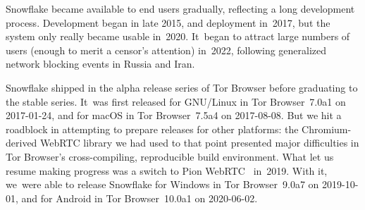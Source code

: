 \documentclass[letterpaper,twocolumn]{article}
\begin{document}
Snowflake became available to end users gradually,
reflecting a long development process.
Development began in late 2015,
and deployment in~2017,
but the system only really became usable in~2020.
It~began to attract large numbers of users
(enough to merit a censor's attention)
in~2022, following generalized
network blocking events in Russia and Iran.

Snowflake shipped in the alpha release series of Tor Browser
before graduating to the stable series.
It~was first released for GNU/Linux
in Tor Browser~7.0a1 on \mbox{2017-01-24},
and for macOS
in Tor Browser~7.5a4 on \mbox{2017-08-08}.
But we hit a roadblock in attempting to prepare releases for other platforms:
the Chromium-derived WebRTC library we had used to that point
presented major difficulties
in Tor Browser's
cross-compiling, reproducible build environment.
What let us resume making progress was a switch to
Pion WebRTC~\cite{pion-webrtc} in~2019.
With it, we~were able to release
Snowflake for Windows
in Tor Browser~9.0a7 on \mbox{2019-10-01},
and for Android in
Tor Browser~10.0a1 on \mbox{2020-06-02}.
\end{document}
